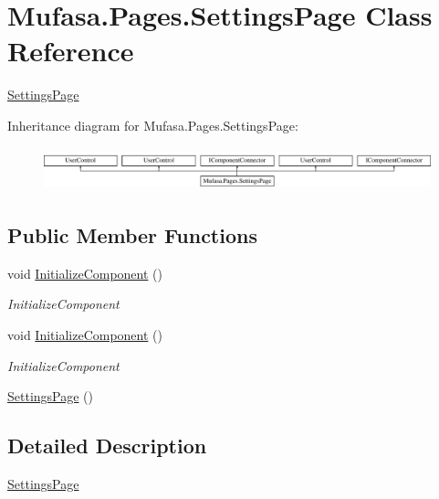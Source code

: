 \hypertarget{class_mufasa_1_1_pages_1_1_settings_page}{\section{Mufasa.\+Pages.\+Settings\+Page Class Reference}
\label{class_mufasa_1_1_pages_1_1_settings_page}
}


\hyperlink{class_mufasa_1_1_pages_1_1_settings_page}{Settings\+Page}  


Inheritance diagram for Mufasa.\+Pages.\+Settings\+Page\+:\begin{figure}[H]
\begin{center}
\leavevmode
\includegraphics[height=1.258427cm]{class_mufasa_1_1_pages_1_1_settings_page}
\end{center}
\end{figure}
\subsection*{Public Member Functions}
\begin{DoxyCompactItemize}
\item 
void \hyperlink{class_mufasa_1_1_pages_1_1_settings_page_a32052ee7f930dd459c8e572d38a97b1c}{Initialize\+Component} ()
\begin{DoxyCompactList}\small\item\em Initialize\+Component \end{DoxyCompactList}\item 
void \hyperlink{class_mufasa_1_1_pages_1_1_settings_page_a32052ee7f930dd459c8e572d38a97b1c}{Initialize\+Component} ()
\begin{DoxyCompactList}\small\item\em Initialize\+Component \end{DoxyCompactList}\item 
\hyperlink{class_mufasa_1_1_pages_1_1_settings_page_a8fdb70faa36c8d90b0b97a3fd8d9667b}{Settings\+Page} ()
\end{DoxyCompactItemize}


\subsection{Detailed Description}
\hyperlink{class_mufasa_1_1_pages_1_1_settings_page}{Settings\+Page} 

